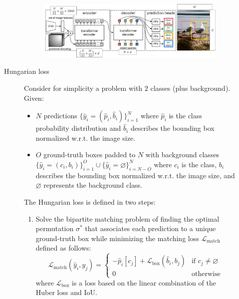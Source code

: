 \begin{description}
\begin{description}
                \begin{figure}[H]
                    \centering
                    \includegraphics[width=0.75\linewidth]{./img/_detr_architecture.pdf}
                \end{figure}

            \item[Hungarian loss] 
                Consider for simplicity a problem with $2$ classes (plus background). Given:
                \begin{itemize}
                    \item $N$ predictions $\{ \hat{y}_i = (\hat{p}_i, \hat{b}_i) \}_{i=1}^N$ where $\hat{p}_i$ is the class probability distribution and $\hat{b}_i$ describes the bounding box normalized w.r.t. the image size.
                    \item $O$ ground-truth boxes padded to $N$ with background classes $\{ \hat{y}_i = (c_i, b_i) \}_{i=1}^O \cup \{ \hat{y}_i = \varnothing \}_{i=N - O}^{N}$ where $c_i$ is the class, $b_i$ describes the bounding box normalized w.r.t. the image size, and $\varnothing$ represents the background class.
                \end{itemize}

                The Hungarian loss is defined in two steps:
                \begin{enumerate}
                    \item Solve the bipartite matching problem of finding the optimal permutation $\sigma^*$ that associates each prediction to a unique ground-truth box while minimizing the matching loss $\mathcal{L}_\text{match}$ defined as follows:
                    \[ 
                        \mathcal{L}_\text{match}(\hat{y}_i, y_j) = \begin{cases}
                            -\hat{p}_i[c_j] + \mathcal{L}_\text{box}(\hat{b}_i, b_j) & \text{if $c_j \neq \varnothing$} \\
                            0 & \text{otherwise}
                        \end{cases} 
                    \]
                    where $\mathcal{L}_\text{box}$ is a loss based on the linear combination of the Huber loss and IoU.


\end{enumerate}
\end{description}
\end{description}
